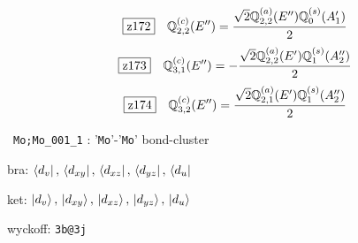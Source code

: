 \documentclass[fleqn,10pt,landscape]{jsarticle}
\begin{document}
\begin{dmath*}
\hspace*{3mm}\fbox{z172}\quad \mathbb{Q}_{2,2}^{(c)}(E^{\prime\prime})=\frac{\sqrt{2} \mathbb{Q}_{2,2}^{(a)}(E^{\prime\prime}) \mathbb{Q}_{0}^{(s)}(A_{1}^{\prime})}{2}
\end{dmath*}
\begin{dmath*}
\hspace*{3mm}\fbox{z173}\quad \mathbb{Q}_{3,1}^{(c)}(E^{\prime\prime})=- \frac{\sqrt{2} \mathbb{Q}_{2,2}^{(a)}(E^{\prime}) \mathbb{Q}_{1}^{(s)}(A_{2}^{\prime\prime})}{2}
\end{dmath*}
\begin{dmath*}
\hspace*{3mm}\fbox{z174}\quad \mathbb{Q}_{3,2}^{(c)}(E^{\prime\prime})=\frac{\sqrt{2} \mathbb{Q}_{2,1}^{(a)}(E^{\prime}) \mathbb{Q}_{1}^{(s)}(A_{2}^{\prime\prime})}{2}
\end{dmath*}
\vspace{5mm}

\noindent\textbullet\, \texttt{Mo;Mo_001_1} : '\texttt{Mo}'-'\texttt{Mo}' bond-cluster

\noindent\quad * bra: $\bra{d_{v}},\, \bra{d_{xy}},\, \bra{d_{xz}},\, \bra{d_{yz}},\, \bra{d_{u}}$

\noindent\quad * ket: $\ket{d_{v}},\, \ket{d_{xy}},\, \ket{d_{xz}},\, \ket{d_{yz}},\, \ket{d_{u}}$

\noindent\quad * wyckoff: \texttt{3b@3j}
\end{document}
